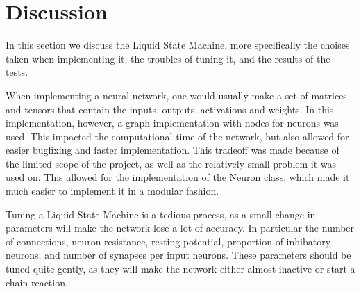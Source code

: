 \section{Discussion}

In this section we discuss the Liquid State Machine, more specifically the choises taken when implementing it, the troubles of tuning it, and the results of the tests.

When implementing a neural network, one would usually make a set of matrices and tensors that contain the inputs, outputs, activations and weights. In this implementation, however, a graph implementation with nodes for neurons was used. This impacted the computational time of the network, but also allowed for easier bugfixing and faster implementation. This tradeoff was made because of the limited scope of the project, as well as the relatively small problem it was used on. This allowed for the implementation of the Neuron class, which made it much easier to implement it in a modular fashion.

Tuning a Liquid State Machine is a tedious process, as a small change in parameters will make the network lose a lot of accuracy. In particular the number of connections, neuron resistance, resting potential, proportion of inhibatory neurons, and number of synapses per input neurons. These parameters should be tuned quite gently, as they will make the network either almost inactive or start a chain reaction.